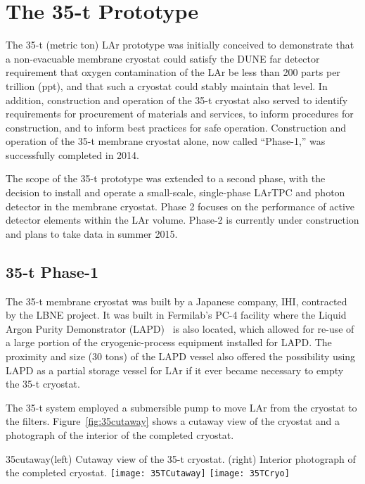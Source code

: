 \section{The 35-t Prototype}
\label{sec:proto-35t}

The 35-t (metric ton) LAr prototype was initially conceived to demonstrate that a non-evacuable
membrane cryostat could satisfy the DUNE far detector requirement that oxygen contamination
of the LAr be less than 200 parts per trillion (ppt), and that such a cryostat
could stably maintain that level.  In addition, construction and operation of the
35-t cryostat also served to identify requirements for procurement of materials and services,
to inform procedures for construction, and to inform best practices for safe operation.
Construction and operation of the 35-t membrane cryostat alone, now called ``Phase-1,''
was successfully completed in 2014.

The scope of the 35-t prototype was extended to a second phase, with the decision to install
and operate a small-scale, single-phase LArTPC and photon detector in the membrane cryostat.
Phase 2 focuses on the performance of active detector elements within the LAr volume.
Phase-2 is currently under construction and plans to take data in summer 2015.

\subsection{35-t Phase-1}

The 35-t membrane cryostat was built by a Japanese company, IHI\cite{bib:ihicorp},
contracted by the LBNE project.  It was built in Fermilab's PC-4 facility where the Liquid Argon Purity
Demonstrator (LAPD)~\cite{bib:lapdP07005} is also located, which allowed for re-use of a large portion
 of the cryogenic-process equipment installed for LAPD.  The proximity and size (30 tons) of the LAPD
 vessel also offered the possibility using LAPD as a partial storage vessel for LAr if it ever
 became necessary to empty the 35-t cryostat.

The 35-t system employed a submersible pump to move LAr from the cryostat to the filters.
Figure~\ref{fig:35cutaway} shows a cutaway view of the cryostat and a photograph of the interior
of the completed cryostat.

\begin{cdrfigure}{35cutaway}{(left) Cutaway view of the 35-t cryostat. (right) Interior
photograph of the completed cryostat.}
\texttt{[image: 35TCutaway]}
\texttt{[image: 35TCryo]}
\end{cdrfigure}

